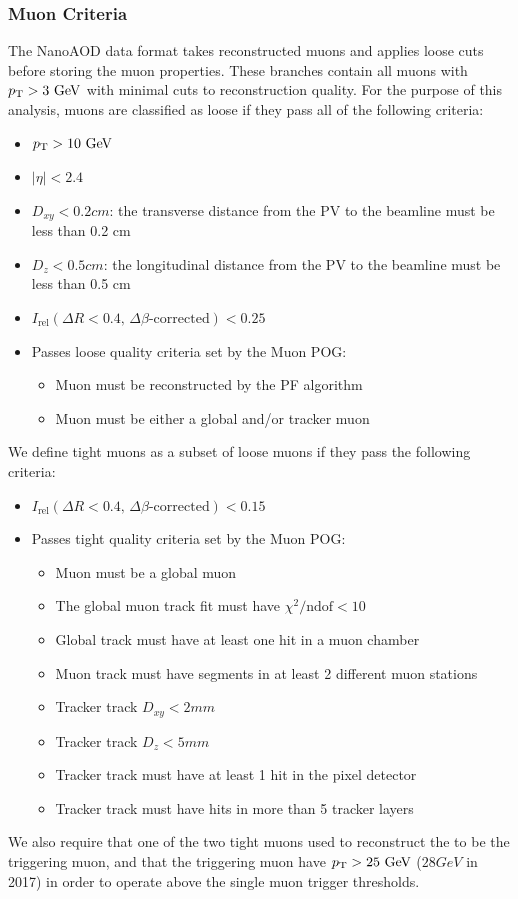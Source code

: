 \subsubsection{Muon Criteria} \label{sec:ana_muons}
The NanoAOD data format takes reconstructed muons and applies loose cuts before storing the muon properties. These branches contain all muons with $\pt>3\unit{GeV}$ with minimal cuts to reconstruction quality. For the purpose of this analysis, muons are classified as loose if they pass all of the following criteria:
\begin{itemize}
	\item $\pt>10\unit{GeV}$
	\item $|\eta|<2.4$
	\item $D_{xy}<0.2\unit{cm}$: the transverse distance from the PV to the beamline must be less than 0.2 cm
	\item $D_{z}<0.5\unit{cm}$: the longitudinal distance from the PV to the beamline must be less than 0.5 cm
	\item $I_\text{rel}(\Delta R<0.4,\,\Delta\beta\text{-corrected})<0.25$
	\item Passes loose quality criteria set by the Muon POG:
	\begin{itemize}
		\item Muon must be reconstructed by the PF algorithm
		\item Muon must be either a global and/or tracker muon
	\end{itemize}
\end{itemize}
We define tight muons as a subset of loose muons if they pass the following criteria:
\begin{itemize}
	\item $I_\text{rel}(\Delta R<0.4,\,\Delta\beta\text{-corrected})<0.15$
	\item Passes tight quality criteria set by the Muon POG:
	\begin{itemize}
		\item Muon must be a global muon
		\item The global muon track fit must have $\chi^2/\text{ndof}<10$
		\item Global track must have at least one hit in a muon chamber %
		\item Muon track must have segments in at least 2 different muon stations %
		\item Tracker track $D_{xy}<2\unit{mm}$
		\item Tracker track $D_{z}<5\unit{mm}$
		\item Tracker track must have at least 1 hit in the pixel detector
		\item Tracker track must have hits in more than 5 tracker layers
	\end{itemize}
\end{itemize}
We also require that one of the two tight muons used to reconstruct the \VZ to be the triggering muon, and that the triggering muon have $\pt>25\unit{GeV}$ ($28\unit{GeV}$ in 2017) in order to operate above the single muon trigger \pt thresholds.

